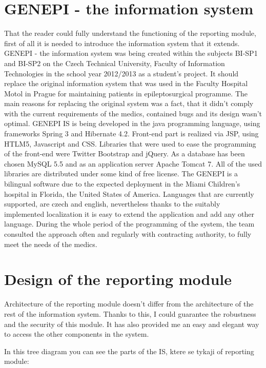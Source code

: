 \documentclass[thesis=B,english]{FITthesis}[2012/10/20]
\begin{document}
\section{GENEPI - the information system}
That the reader could fully understand the functioning of the reporting module, first of all it is needed to introduce the information system that it extends. GENEPI - the information system was being created within the subjects BI-SP1 and BI-SP2 on the Czech Technical University, Faculty of Information Technologies in the school year 2012/2013 as a student's project. It should replace the original information system that was used in the Faculty Hospital Motol in Prague for maintaining patients in epileptosurgical programme. The main reasons for replacing the original system was a fact, that it didn't comply with the current requirements of the medics, contained bugs and its design wasn't optimal. GENEPI IS is being developed in the java programming language, using frameworks Spring 3 and Hibernate 4.2. Front-end part is realized via JSP, using HTLM5, Javascript and CSS. Libraries that were used to ease the programming of the front-end were Twitter Bootstrap and jQuery. As a database has been chosen MySQL 5.5 and as an application server Apache Tomcat 7. All of the used libraries are distributed under some kind of free license. The GENEPI is a bilingual software due to the expected deployment in the Miami Children's hospital in Florida, the United States of America. Languages that are currently supported, are czech and english, nevertheless thanks to the suitably implemented localization it is easy to extend the application and add any other language. During the whole period of the programming of the system, the team consulted the approach often  and regularly with contracting authority, to fully meet the needs of the medics.

\section{Design of the reporting module}
Architecture of the reporting module doesn't differ from the architecture of the rest of the information system. Thanks to this, I could guarantee the robustness and the security of this module. It has also provided me an easy and elegant way to access the other components in the system.



In this tree diagram you can see the parts of the IS, ktere se tykaji of reporting module:
\end{document}
